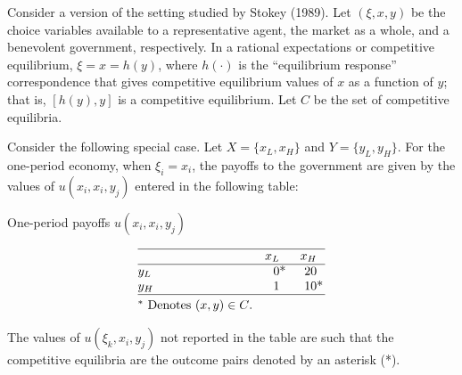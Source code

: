 \medskip

 \quad
  Consider a version of the setting studied by Stokey (1989). Let
$(\xi, x, y)$
be the choice variables available to a representative agent, the
market as a whole, and a benevolent government, respectively.  In a
rational expectations or competitive equilibrium, $\xi = x = h(y)$, where
$h(\cdot)$ is the ``equilibrium response'' correspondence that
gives competitive equilibrium values of $x$ as a function of
$y$; that is, $[h(y),y]$ is a competitive equilibrium.  Let $C$ be
the set of competitive equilibria.

Consider the following special case.  Let $X= \{x_L,x_H\}$ and
$Y = \{y_L,y_H\}$. For the one-period economy,
when $\xi_i = x_i$, the payoffs to the government
 are given by the values of $u(x_i,x_i,y_j)$ entered in
the following table:

\smallskip

\centerline{One-period payoffs $u(x_i,x_i,y_j)$}
$$\vbox{\offinterlineskip
\hrule
\halign{\strut #\hfil &\quad \hfil# &\quad \hfil# \cr
& $x_L$ & $x_H$ \cr \noalign{\hrule}
$y_L$ & $0\rlap{*}$ & $20$ \cr
$y_H$ & 1 & $10\rlap{*}$ \cr \noalign{\hrule}
\noalign{\smallskip}
\hbox{$^\ast$ Denotes $(x,y)\in C$.}\cr
              }}$$

\smallskip\noindent
The values of $u(\xi_k,x_i,y_j)$ not reported in the table
are such that the competitive equilibria are the outcome pairs
denoted by an asterisk (*).


